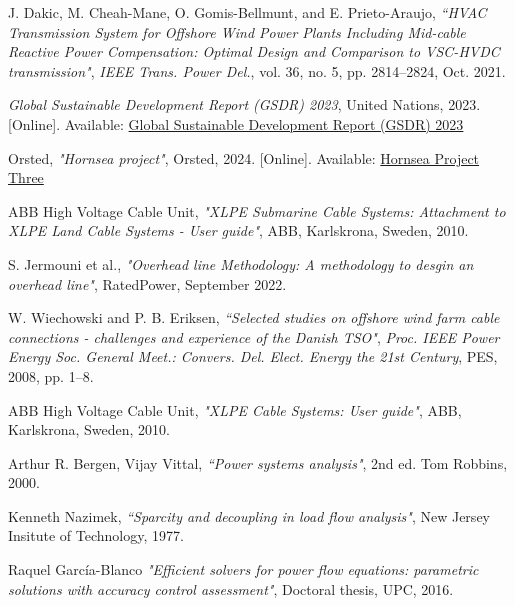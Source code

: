 \documentclass[a4paper,11pt, titlepage, twoside]{article}
\begin{document}
 \begin{thebibliography}{99}\label{biblio}
 

 {J. Dakic, M. Cheah-Mane, O. Gomis-Bellmunt, and E. Prieto-Araujo},
\textit{“HVAC Transmission System for Offshore Wind Power Plants Including
 Mid-cable Reactive Power Compensation: Optimal Design and Comparison to VSC-HVDC transmission"}, \textit{IEEE Trans. Power Del.}, vol. 36,
 no. 5, pp. 2814–2824, Oct. 2021.


 \textit{Global Sustainable Development Report (GSDR) 2023}, United Nations, 2023. [Online]. 
 Available: \href{https://sdgs.un.org/gsdr/gsdr2023}{Global Sustainable Development Report (GSDR) 2023}
 
 

{Orsted},
\textit{"Hornsea project"}, Orsted, 2024. [Online]. Available: \href{https://hornseaproject3.co.uk/about-the-project}{Hornsea Project Three}



{ABB High Voltage Cable Unit},
\textit{"XLPE Submarine Cable Systems: Attachment to XLPE Land Cable Systems - User guide"}, ABB, Karlskrona, Sweden, 2010.


{S. Jermouni et al.},
\textit{"Overhead line Methodology: A methodology to desgin an overhead line"}, RatedPower, September 2022.


 {W. Wiechowski and P. B. Eriksen},
\textit{“Selected studies on offshore wind farm
cable connections - challenges and experience of the Danish TSO"}, \textit{Proc.
IEEE Power Energy Soc. General Meet.: Convers. Del. Elect. Energy the
21st Century}, PES, 2008, pp. 1–8.


{ABB High Voltage Cable Unit},
\textit{"XLPE Cable Systems: User guide"}, ABB, Karlskrona, Sweden, 2010.


 {Arthur R. Bergen, Vijay Vittal},
\textit{“Power systems analysis"}, 2nd ed. Tom Robbins, 2000.

{Kenneth Nazimek},
\textit{“Sparcity and decoupling in load flow analysis"}, New Jersey Insitute of Technology, 1977.

{ Raquel García-Blanco}
\textit{"Efficient solvers for power flow equations: parametric solutions with accuracy control assessment"}, Doctoral thesis, UPC, 2016.



\end{thebibliography}
\end{document}
